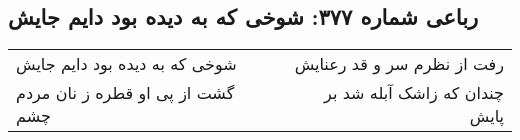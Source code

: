 \begin{center}
\section*{رباعی شماره ۳۷۷: شوخی که به دیده بود دایم جایش}
\label{sec:sh377}
\begin{longtable}{l p{0.5cm} r}
شوخی که به دیده بود دایم جایش
&&
رفت از نظرم سر و قد رعنایش
\\
گشت از پی او قطره ز نان مردم چشم
&&
چندان که زاشک آبله شد بر پایش
\\
\end{longtable}
\end{center}

